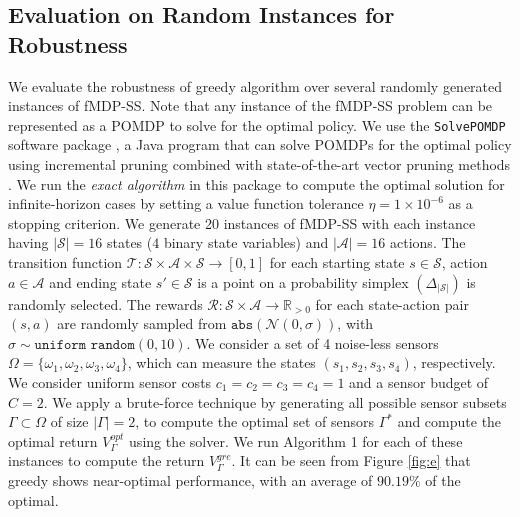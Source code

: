 \documentclass[twocolumn]{autart}    %
\begin{document}
\vspace{-1mm}
\subsection{Evaluation on Random Instances for Robustness} 
 We evaluate the robustness of greedy algorithm over several randomly generated instances of fMDP-SS. Note that any instance of the fMDP-SS problem can be represented as a POMDP to solve for the optimal policy. We use the \texttt{SolvePOMDP} software package \cite{solvepomdp}, a Java program that can solve POMDPs for the optimal policy using incremental pruning combined with state-of-the-art vector pruning methods \cite{walraven2017accelerated}. We run the \textit{exact algorithm} in this package to compute the optimal solution for infinite-horizon cases by setting a value function tolerance $\eta = 1 \times 10^{-6}$ as a stopping criterion.
 We generate 20 instances of fMDP-SS with each instance having $|\mathcal{S}| = 16$ states ($4$ binary state variables) and $|\mathcal{A}| = 16$ actions. The transition function $\mathcal{T}: \mathcal{S} \times \mathcal{A} \times \mathcal{S} \rightarrow [0,1] $ for each starting state  $s \in \mathcal{S} $, action $a \in \mathcal{A} $ and ending state  $s' \in \mathcal{S} $ is a point on a probability simplex $(\Delta_{|\mathcal{S}|})$ is randomly selected. The rewards $\mathcal{R}: \mathcal{S} \times \mathcal{A} \rightarrow \mathbb{R}_{>0} $ for each state-action pair $(s,a)$ are randomly sampled from $\texttt{abs}(\mathcal{N}(0,\sigma))$, with $\sigma \sim \texttt{uniform random} (0,10)$. We consider a set of 4 noise-less sensors $\Omega = \{\omega_1,\omega_2,\omega_3,\omega_4\}$, which can measure the states $(s_1, s_2, s_3, s_4)$, respectively. We consider uniform sensor costs $ c_1 = c_2 = c_3 = c_4 = 1$ and a sensor budget of $C = 2$. We apply a brute-force technique by generating all possible sensor subsets $\Gamma \subset \Omega$ of size $|\Gamma| = 2$, to compute the optimal set of sensors $\Gamma^*$ and compute the optimal return $V_\Gamma^{opt}$ using the solver. We run Algorithm 1 for each of these instances to compute the return $V_\Gamma^{gre}$. It can be seen from Figure \ref{fig:e} that greedy shows near-optimal performance, with an average of $90.19\%$ of the optimal. 
\end{document}
